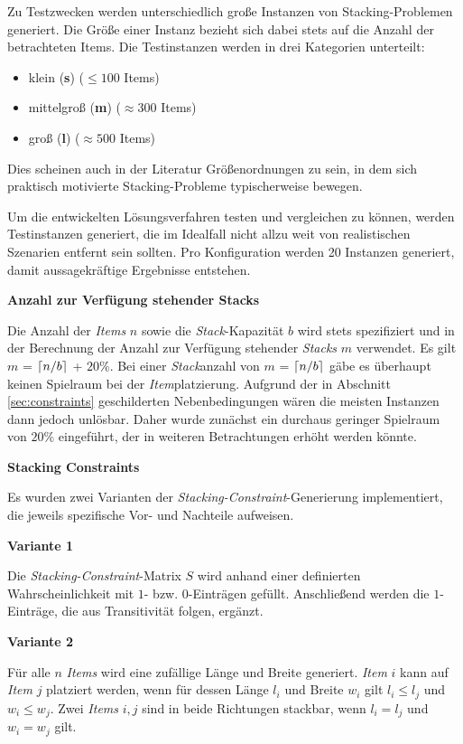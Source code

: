 Zu Testzwecken werden unterschiedlich große Instanzen von Stacking-Problemen generiert. Die Größe einer
Instanz bezieht sich dabei stets auf die Anzahl der betrachteten Items. Die Testinstanzen werden
in drei Kategorien unterteilt:
\begin{itemize}
  \item klein (\textbf{s}) ($\leq 100$ Items)
  \item mittelgroß (\textbf{m}) ($\approx 300$ Items)
  \item groß (\textbf{l}) ($\approx 500$ Items)\newline
\end{itemize}
Dies scheinen auch in der Literatur Größenordnungen zu sein, in dem sich praktisch motivierte Stacking-Probleme
typischerweise bewegen. \cite{Le2016}

Um die entwickelten Lösungsverfahren testen und vergleichen zu können, werden Testinstanzen generiert,
die im Idealfall nicht allzu weit von realistischen Szenarien entfernt sein sollten.
Pro Konfiguration werden 20 Instanzen generiert, damit aussagekräftige Ergebnisse entstehen.

\textbf{Anzahl zur Verfügung stehender Stacks}

Die Anzahl der \textit{Items} $n$ sowie die \textit{Stack}-Kapazität $b$ wird stets spezifiziert und in der Berechnung der Anzahl
zur Verfügung stehender \textit{Stacks} $m$ verwendet. Es gilt $m$ = $\lceil n / b\rceil$ + $20 \%$.
Bei einer \textit{Stack}anzahl von $m$ = $\lceil n / b\rceil$ gäbe es überhaupt keinen Spielraum bei der \textit{Item}platzierung. Aufgrund der in Abschnitt \ref{sec:constraints} geschilderten Nebenbedingungen wären die meisten Instanzen dann jedoch unlösbar.
Daher wurde zunächst ein durchaus geringer Spielraum von $20 \%$ eingeführt, der in weiteren Betrachtungen erhöht werden könnte.

\textbf{Stacking Constraints}

Es wurden zwei Varianten der \textit{Stacking-Constraint}-Generierung implementiert, die jeweils spezifische Vor- und Nachteile aufweisen.

\textbf{Variante 1}

Die \textit{Stacking-Constraint}-Matrix $S$ wird anhand einer definierten Wahrscheinlichkeit mit $1$- bzw. $0$-Einträgen gefüllt.
Anschließend werden die $1$-Einträge, die aus Transitivität folgen, ergänzt.

\textbf{Variante 2}

Für alle $n$ \textit{Items} wird eine zufällige Länge und Breite generiert. \textit{Item} $i$ kann auf \textit{Item} $j$ platziert werden,
wenn für dessen Länge $l_i$ und Breite $w_i$ gilt $l_i \leq l_j$ und $w_i \leq w_j$.
Zwei \textit{Items} $i, j$ sind in beide Richtungen stackbar, wenn $l_i = l_j$ und $w_i = w_j$ gilt.

